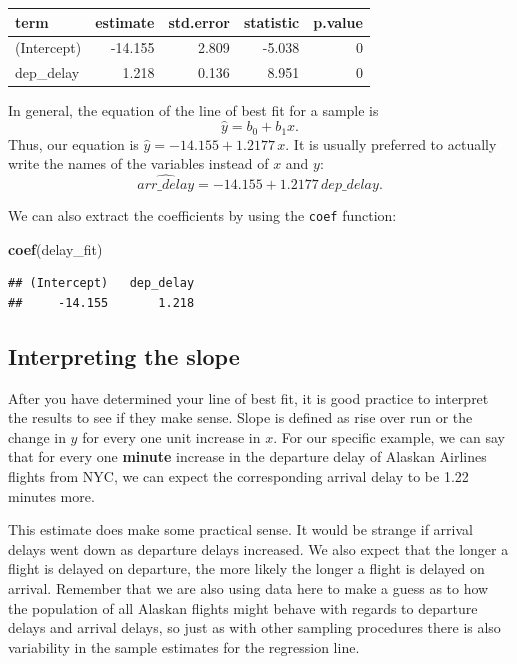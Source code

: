 \documentclass[]{tufte-book}
\newenvironment{Shaded}{\begin{snugshade}}{\end{snugshade}}
\newcommand{\KeywordTok}[1]{\textcolor[rgb]{0.13,0.29,0.53}{\textbf{{#1}}}}
\newcommand{\NormalTok}[1]{{#1}}
\theoremstyle{definition}
\theoremstyle{definition}
\theoremstyle{remark}
\begin{document}
\begin{tabular}{l|r|r|r|r}
\hline
term & estimate & std.error & statistic & p.value\\
\hline
(Intercept) & -14.155 & 2.809 & -5.038 & 0\\
\hline
dep\_delay & 1.218 & 0.136 & 8.951 & 0\\
\hline
\end{tabular}

In general, the equation of the line of best fit for a sample is
\[\hat{y} = b_0 + b_1 x.\] Thus, our equation is
\(\hat{y} = -14.155 + 1.2177 \, x.\) It is usually preferred to actually
write the names of the variables instead of \(x\) and \(y\):
\[\widehat{arr\_delay} = -14.155 + 1.2177 \, dep\_delay.\]

We can also extract the coefficients by using the \texttt{coef}
function:

\begin{Shaded}
\begin{Highlighting}[]
\KeywordTok{coef}\NormalTok{(delay_fit)}
\end{Highlighting}
\end{Shaded}

\begin{verbatim}
## (Intercept)   dep_delay 
##     -14.155       1.218
\end{verbatim}

\subsection{Interpreting the slope}\label{interpreting-the-slope}

After you have determined your line of best fit, it is good practice to
interpret the results to see if they make sense. Slope is defined as
rise over run or the change in \(y\) for every one unit increase in
\(x\). For our specific example, we can say that for every one
\textbf{minute} increase in the departure delay of Alaskan Airlines
flights from NYC, we can expect the corresponding arrival delay to be
1.22 minutes more.

This estimate does make some practical sense. It would be strange if
arrival delays went down as departure delays increased. We also expect
that the longer a flight is delayed on departure, the more likely the
longer a flight is delayed on arrival. Remember that we are also using
data here to make a guess as to how the population of all Alaskan
flights might behave with regards to departure delays and arrival
delays, so just as with other sampling procedures there is also
variability in the sample estimates for the regression line.
\end{document}
